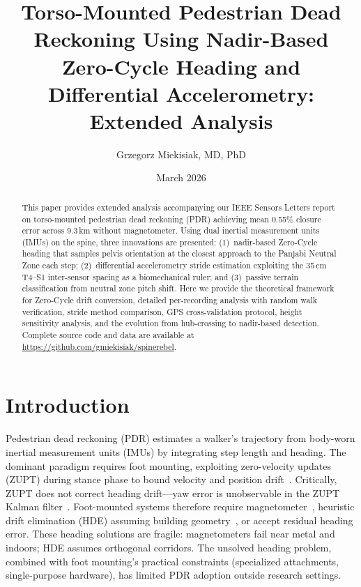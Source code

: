 \documentclass[11pt,a4paper]{article}
\title{Torso-Mounted Pedestrian Dead Reckoning Using Nadir-Based\\
Zero-Cycle Heading and Differential Accelerometry:\\
\large Extended Analysis}
\author{Grzegorz Miekisiak, MD, PhD}
\affil{Vratislavia Medica Hospital, Wroc\l{}aw, Poland\\
SpineRebel Technology\\
\texttt{grzegorz@spinerebel.com}}
\date{March 2026}
\begin{document}
\maketitle

\begin{abstract}
This paper provides extended analysis accompanying our IEEE Sensors Letters
report on torso-mounted pedestrian dead reckoning (PDR) achieving mean 0.55\%
closure error across 9.3\,km without magnetometer. Using dual inertial
measurement units (IMUs) on the spine, three innovations are presented:
(1)~nadir-based Zero-Cycle heading that samples pelvis orientation at the
closest approach to the Panjabi Neutral Zone each step; (2)~differential
accelerometry stride estimation exploiting the 35\,cm T4--S1 inter-sensor
spacing as a biomechanical ruler; and (3)~passive terrain classification from
neutral zone pitch shift. Here we provide the theoretical framework for
Zero-Cycle drift conversion, detailed per-recording analysis with random walk
verification, stride method comparison, GPS cross-validation protocol, height
sensitivity analysis, and the evolution from hub-crossing to nadir-based
detection. Complete source code and data are available at
\url{https://github.com/gmiekisiak/spinerebel}.
\end{abstract}

\tableofcontents
\newpage

\section{Introduction}
\label{sec:intro}

Pedestrian dead reckoning (PDR) estimates a walker's trajectory from body-worn
inertial measurement units (IMUs) by integrating step length and heading. The
dominant paradigm requires foot mounting, exploiting zero-velocity updates
(ZUPT) during stance phase to bound velocity and position
drift~\cite{foxlin2005,skog2010}. Critically, ZUPT does not correct heading
drift---yaw error is unobservable in the ZUPT Kalman
filter~\cite{nilsson2012}. Foot-mounted systems therefore require
magnetometer~\cite{foxlin2005}, heuristic drift elimination (HDE) assuming
building geometry~\cite{borenstein2010}, or accept residual heading error.
These heading solutions are fragile: magnetometers fail near metal and indoors;
HDE assumes orthogonal corridors. The unsolved heading problem, combined with
foot mounting's practical constraints (specialized attachments, single-purpose
hardware), has limited PDR adoption outside research settings.
\end{document}
